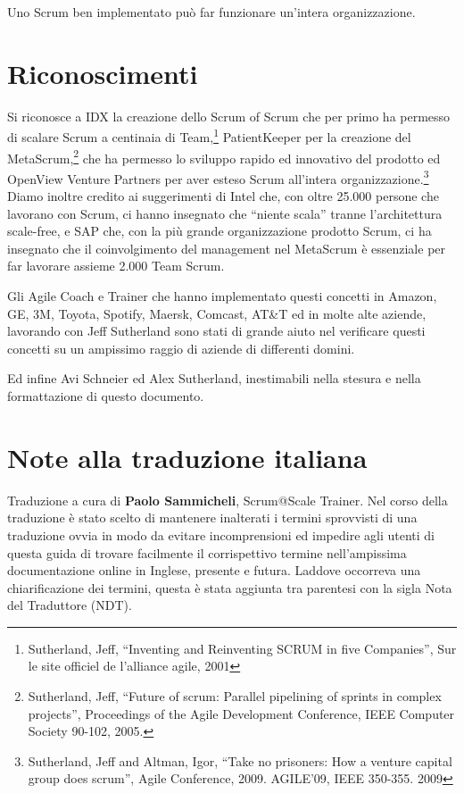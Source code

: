 \documentclass[italian,12pt,a4paper,parskip=full]{scrartcl}
\begin{document}
Uno Scrum ben implementato può far funzionare un'intera organizzazione.

\section{Riconoscimenti}
Si riconosce a IDX la creazione dello Scrum of Scrum che per primo ha permesso di scalare Scrum a centinaia di Team,\footnote{Sutherland, Jeff,
``Inventing and Reinventing SCRUM in five Companies'', Sur le site officiel
de l'alliance agile, 2001} PatientKeeper per la creazione del MetaScrum,\footnote{Sutherland, Jeff, ``Future of scrum: Parallel pipelining
of sprints in complex projects'', Proceedings of the Agile Development
Conference,  IEEE Computer Society 90-102,  2005.}  che ha permesso lo sviluppo rapido ed innovativo del prodotto ed OpenView Venture Partners per aver esteso Scrum all'intera organizzazione.\footnote{Sutherland, Jeff and Altman,
Igor, ``Take no prisoners: How a venture capital group does scrum'', Agile
Conference, 2009. AGILE'09, IEEE 350-355.  2009} Diamo inoltre credito ai suggerimenti di Intel che, con oltre 25.000 persone che lavorano con Scrum, ci hanno insegnato che ``niente scala'' tranne l'architettura scale-free, e SAP che, con la più grande organizzazione prodotto Scrum, ci ha insegnato che il coinvolgimento del management nel MetaScrum è essenziale per far lavorare assieme 2.000 Team Scrum.

Gli Agile Coach e Trainer che hanno implementato questi concetti in Amazon, GE, 3M, Toyota, Spotify, Maersk, Comcast, AT\&T ed in molte alte aziende, lavorando con Jeff Sutherland sono stati di grande aiuto nel verificare questi concetti su un ampissimo raggio di aziende di differenti domini.

Ed infine Avi Schneier ed Alex Sutherland, inestimabili nella stesura e nella formattazione di questo documento.

\section{Note alla traduzione italiana}
Traduzione a cura di \textbf{Paolo Sammicheli}, Scrum@Scale Trainer. Nel corso della traduzione è stato scelto di mantenere inalterati i termini sprovvisti di una traduzione ovvia in modo da evitare incomprensioni ed impedire agli utenti di questa guida di trovare facilmente il corrispettivo termine nell'ampissima documentazione online in Inglese, presente e futura. Laddove occorreva una chiarificazione dei termini, questa è stata aggiunta tra parentesi con la sigla Nota del Traduttore (NDT).

\pagebreak

\printbibliography
\end{document}
